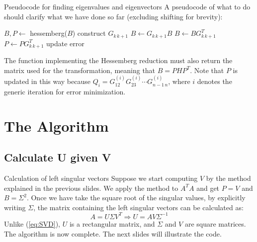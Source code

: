 \documentclass[10pt]{beamer}
\begin{document}
\begin{frame}{Pseudocode for finding eigenvalues and eigenvectors}
    A pseudocode of what to do should clarify what we have done so far (excluding shifting for brevity):
    \begin{algorithmic}
        \footnotesize
        \State $B, P \gets $ hessemberg($ B $)
                \State construct $G_{k \, k+1}$
                \State $B \gets G_{k \, k+1} B$
            \EndFor
                \State $B \gets B G_{k \, k+1}^T$
                \State $P \gets P G_{k \, k+1}^T$
            \EndFor
            \State update error
        \EndWhile
    \end{algorithmic}
    The function implementing the Hessemberg reduction must also return the matrix used for the transformation, meaning that $B = P H P^T$. \newline
    Note that $P$ is updated in this way because $Q_i = G_{12}^{(i)} G_{23}^{(i)} \cdots G_{n-1 \, n}^{(i)}$, where $i$ denotes the generic iteration for error minimization.
\end{frame}

\section{The Algorithm}

\subsection{Calculate U given V}

\begin{frame}{Calculation of left singular vectors}
    Suppose we start computing $V$ by the method explained in the previous slides. \newline
    We apply the method to $A^T A$ and get $P = V$ and $B = \Sigma^2$. \newline
    Once we have take the square root of the singular values, by explicitly writing $\Sigma$, the matrix containing the left singular vectors can be calculated as:
    $$
    A = U \Sigma V^T \Rightarrow U = A V \Sigma^{-1}
    $$
    Unlike (\ref{eq:SVD}), $U$ is a rectangular matrix, and $\Sigma$ and $V$ are square matrices. \newline
    The algorithm is now complete. The next slides will illustrate the code.
\end{frame}
\end{document}
